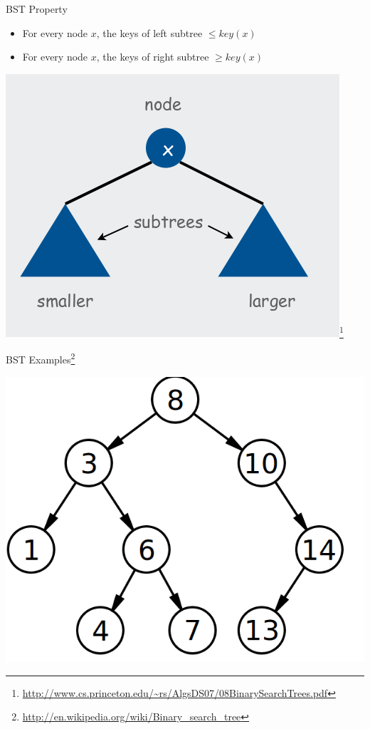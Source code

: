 \documentclass{beamer}
\begin{document}
\begin{frame}{BST Property}
    \begin{itemize}
        \item For every node $x$, the keys of left subtree $\leq key(x)$
        \item For every node $x$, the keys of right subtree $\geq key(x)$
    \end{itemize}
    \begin{center}
        \includegraphics[scale=0.4]{bstProperty.png}\footnote{\url{http://www.cs.princeton.edu/~rs/AlgsDS07/08BinarySearchTrees.pdf}}
    \end{center}
\end{frame}


\begin{frame}{BST Examples\footnote{\url{http://en.wikipedia.org/wiki/Binary_search_tree}}}
    \begin{center}
        \includegraphics[scale=0.4]{bstExample.png}
    \end{center}
\end{frame}
\end{document}
